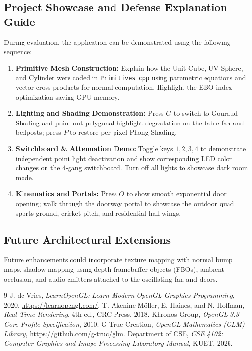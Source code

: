 \documentclass[11pt,a4paper]{article}
\begin{document}
\subsection{Project Showcase and Defense Explanation Guide}
During evaluation, the application can be demonstrated using the following sequence:
\begin{enumerate}[leftmargin=1.2em, itemsep=1.0pt]
    \item \textbf{Primitive Mesh Construction:} Explain how the Unit Cube, UV Sphere, and Cylinder were coded in \texttt{Primitives.cpp} using parametric equations and vector cross products for normal computation. Highlight the EBO index optimization saving GPU memory.
    \item \textbf{Lighting and Shading Demonstration:} Press $G$ to switch to Gouraud Shading and point out polygonal highlight degradation on the table fan and bedposts; press $P$ to restore per-pixel Phong Shading.
    \item \textbf{Switchboard \& Attenuation Demo:} Toggle keys $1, 2, 3, 4$ to demonstrate independent point light deactivation and show corresponding LED color changes on the 4-gang switchboard. Turn off all lights to showcase dark room mode.
    \item \textbf{Kinematics and Portals:} Press $O$ to show smooth exponential door opening; walk through the doorway portal to showcase the outdoor quad sports ground, cricket pitch, and residential hall wings.
\end{enumerate}

\subsection{Future Architectural Extensions}
Future enhancements could incorporate texture mapping with normal bump maps, shadow mapping using depth framebuffer objects (FBOs), ambient occlusion, and audio emitters attached to the oscillating fan and doors.

\vspace{0.2cm}
\renewcommand{\refname}{\normalsize\color{kuetnavy}\textbf{References}}
\begin{thebibliography}{9}
\setlength{\itemsep}{0pt}
\setlength{\parskip}{0pt}
\scriptsize
{}
J. de Vries, \textit{LearnOpenGL: Learn Modern OpenGL Graphics Programming}, 2020. \url{https://learnopengl.com/}.
T. Akenine-M{\"o}ller, E. Haines, and N. Hoffman, \textit{Real-Time Rendering}, 4th ed., CRC Press, 2018.
Khronos Group, \textit{OpenGL 3.3 Core Profile Specification}, 2010.
G-Truc Creation, \textit{OpenGL Mathematics (GLM) Library}, \url{https://github.com/g-truc/glm}.
Department of CSE, \textit{CSE 4102: Computer Graphics and Image Processing Laboratory Manual}, KUET, 2026.
\end{thebibliography}
\end{document}
